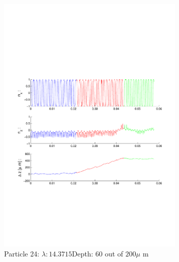 \begin{figure}[ H]

\caption{Particle 24: $ \lambda: 14.3715$Depth: 60 out of $200 \mu $ m}

\centering

\includegraphics[width=0.8\textwidth]{Images/Particle 24/Particle24.pdf}

\end{figure}

